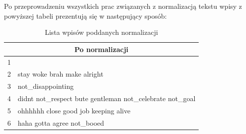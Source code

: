 Po przeprowadzeniu wszystkich prac związanych z normalizacją tekstu wpisy z
powyższej tabeli prezentują się w następujący sposób:

\begin{table}[ht!]  
\begin{center}  
\begin{tabular}{|r|p{140mm}|}
\hline
\multicolumn{2}{|c|}{Po normalizacji}
\\ \hline
1 & 
\\ \hline
2 & stay woke brah make alright
\\ \hline
3 & not\_disappointing
\\ \hline
4 & didnt not\_respect bute gentleman not\_celebrate not\_goal
\\ \hline
5 & ohhhhhh close good job keeping alive
\\ \hline
6 & haha gotta agree not\_booed
\\
\hline
\end{tabular} 
\end{center} 
\caption{Lista wpisów poddanych normalizacji}
\label{tab:wpisy-po-normalizacja}
\end{table}

